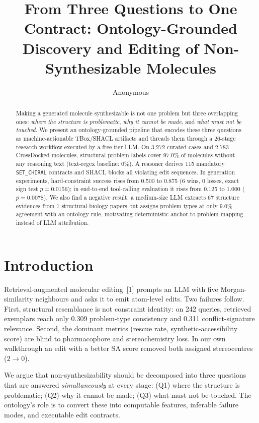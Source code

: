 \documentclass[11pt,a4paper]{article}
\title{From Three Questions to One Contract: Ontology-Grounded Discovery and Editing of Non-Synthesizable Molecules}
\author{Anonymous}
\date{}
\begin{document}
\maketitle

\begin{abstract}
Making a generated molecule synthesizable is not one problem but three overlapping ones: \emph{where the structure is problematic}, \emph{why it cannot be made}, and \emph{what must not be touched}. We present an ontology-grounded pipeline that encodes these three questions as machine-actionable TBox/SHACL artifacts and threads them through a 26-stage research workflow executed by a free-tier LLM. On 3,272 curated cases and 2,783 CrossDocked molecules, structural problem labels cover 97.0\% of molecules without any reasoning text (text-regex baseline: 0\%). A reasoner derives 115 mandatory \texttt{SET\_CHIRAL} contracts and SHACL blocks all violating edit sequences. In generation experiments, hard-constraint success rises from 0.500 to 0.875 (6 wins, 0 losses, exact sign test $p=0.0156$); in end-to-end tool-calling evaluation it rises from 0.125 to 1.000 ($p=0.0078$). We also find a negative result: a medium-size LLM extracts 67 structure evidences from 7 structural-biology papers but assigns problem types at only 9.0\% agreement with an ontology rule, motivating deterministic anchor-to-problem mapping instead of LLM attribution.
\end{abstract}

\section{Introduction}
Retrieval-augmented molecular editing~[1] prompts an LLM with five Morgan-similarity neighbours and asks it to emit atom-level edits. Two failures follow. First, structural resemblance is not constraint identity: on 242 queries, retrieved exemplars reach only 0.309 problem-type consistency and 0.311 conflict-signature relevance. Second, the dominant metrics (rescue rate, synthetic-accessibility score) are blind to pharmacophore and stereochemistry loss. In our own walkthrough an edit with a better SA score removed both assigned stereocentres ($2\!\rightarrow\!0$).

We argue that non-synthesizability should be decomposed into three questions that are answered \emph{simultaneously} at every stage: (Q1) where the structure is problematic; (Q2) why it cannot be made; (Q3) what must not be touched. The ontology's role is to convert these into computable features, inferable failure modes, and executable edit contracts.
\end{document}
